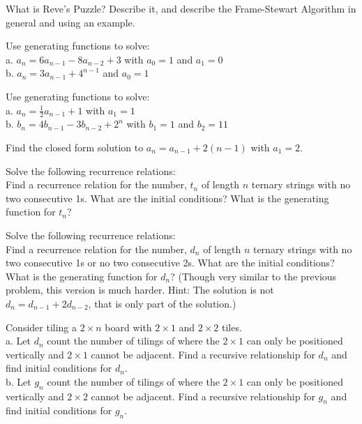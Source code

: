 
\begin{exercise}
What is Reve's Puzzle?  Describe it, and describe the Frame-Stewart Algorithm in general and using an example.
\end{exercise}

\begin{exercise}
Use generating functions to solve:\\
a. $a_n=6a_{n-1}-8a_{n-2}+3$ with $a_0=1$ and $a_1=0$\\
b. $a_n=3a_{n-1}+4^{n-1}$ and $a_0=1$\\
\end{exercise}

\begin{exercise}
Use generating functions to solve:\\
a. $a_n=\frac{1}{2}a_{n-1}+1$ with $a_1=1$\\
b. $b_n=4b_{n-1}-3b_{n-2}+2^n$ with $b_1=1$ and $b_2=11$
\end{exercise}

\begin{exercise}
Find the closed form solution to $a_n=a_{n-1}+2(n-1)$ with $a_1=2$.
\end{exercise}

\begin{exercise} 
Solve the following recurrence relations:\\
Find a recurrence relation for the number, $t_n$ of length $n$ ternary strings with no two consecutive 1s.  What are the initial conditions?  What is the generating function for $t_n$?
\end{exercise}

\begin{exercise} 
Solve the following recurrence relations:\\
Find a recurrence relation for the number, $d_n$ of length $n$ ternary strings with no two consecutive 1s or no two consecutive 2s.  What are the initial conditions?  What is the generating function for $d_n$? (Though very similar to the previous problem, this version is much harder. Hint:  The solution is not $d_n=d_{n-1}+2d_{n-2}$, that is only part of the solution.)
\end{exercise}




\begin{exercise}
Consider tiling a $2 \times n$ board with $2 \times 1$ and $2 \times 2$ tiles.\\
a. Let $d_n$ count the number of tilings of where the $2 \times 1$ can only be positioned vertically and $2 \times 1$ cannot be adjacent.  Find a recursive relationship for $d_n$ and find initial conditions for $d_n$.\\
b. Let $g_n$ count the number of tilings of where the $2 \times 1$ can only be positioned vertically and $2 \times 2$ cannot be adjacent.  Find a recursive relationship for $g_n$ and find initial conditions for $g_n$.\\
\end{exercise}

